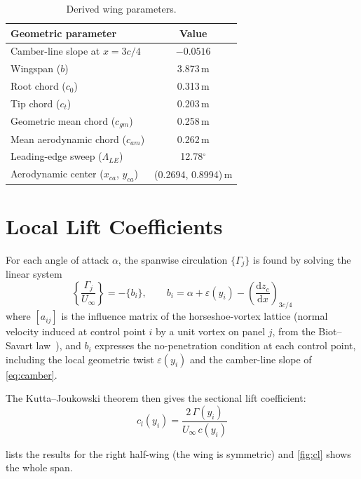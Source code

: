 \documentclass[11pt,letterpaper]{article}
\newcommand{\dd}{\mathrm{d}}
\begin{document}
\begin{table}[H]
  \centering
  \begin{tabular}{lc}
    \toprule
    Geometric parameter & Value \\
    \midrule
    Camber-line slope at $x = 3c/4$ & $-0.0516$ \\
    Wingspan ($b$) & 3.873\,m \\
    Root chord ($c_0$) & 0.313\,m \\
    Tip chord ($c_t$) & 0.203\,m \\
    Geometric mean chord ($c_{gm}$) & 0.258\,m \\
    Mean aerodynamic chord ($c_{am}$) & 0.262\,m \\
    Leading-edge sweep ($\Lambda_{LE}$) & 12.78$^\circ$ \\
    Aerodynamic center ($x_{ca}$, $y_{ca}$) & (0.2694, 0.8994)\,m \\
    \bottomrule
  \end{tabular}
  \caption{Derived wing parameters.}
  \label{tab:geometry}
\end{table}

\section{Local Lift Coefficients}
For each angle of attack $\alpha$, the spanwise circulation $\{\Gamma_j\}$ is found by solving the
linear system
\begin{equation}
  [a_{ij}]\left\{\frac{\Gamma_j}{U_\infty}\right\} = -\{b_i\},
  \qquad
  b_i = \alpha + \varepsilon(y_i) - \left(\frac{\dd z_c}{\dd x}\right)_{3c/4}
  \label{eq:system}
\end{equation}
where $[a_{ij}]$ is the influence matrix of the horseshoe-vortex lattice (normal velocity induced at
control point $i$ by a unit vortex on panel $j$, from the Biot--Savart law~\cite{bertin}), and $b_i$
expresses the no-penetration condition at each control point, including the local geometric twist
$\varepsilon(y_i)$ and the camber-line slope of \cref{eq:camber}.

The Kutta--Joukowski theorem then gives the sectional lift coefficient:
\begin{equation}
  c_l(y_i) = \frac{2\,\Gamma(y_i)}{U_\infty\, c(y_i)}
\end{equation}

 lists the results for the right half-wing (the wing is symmetric) and
\cref{fig:cl} shows the whole span.
\end{document}
